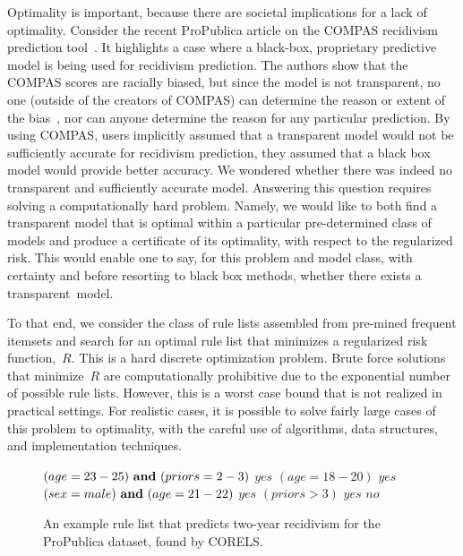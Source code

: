 Optimality is important, because there are societal implications for a lack of optimality.
%
Consider the recent ProPublica article on the COMPAS recidivism prediction tool~\citep{LarsonMaKiAn16}.
%
It highlights a case where a black-box, proprietary predictive model is being used for recidivism prediction.
%
The authors show that the COMPAS scores are racially biased, but since the model is not transparent, no one (outside of the creators of COMPAS) can determine the reason or extent of the bias~\citep{LarsonMaKiAn16}, nor can anyone determine the reason for any particular prediction.
%
By using COMPAS, users implicitly assumed that a transparent model
would not be sufficiently accurate for recidivism prediction,
\ie they assumed that a black box model would provide better accuracy.
%
We wondered whether there was indeed no transparent and sufficiently accurate model.
%
Answering this question requires solving a computationally hard problem.
%
Namely, we would like to both find a transparent model that is optimal
within a particular pre-determined class of models
and produce a certificate of its optimality, with respect to the regularized risk.
%
This would enable one to say, for this problem and model class,
with certainty and before resorting to black box methods,
whether there exists a transparent~model.

To that end, we consider the class of rule lists assembled from pre-mined frequent itemsets
and search for an optimal rule list that minimizes a regularized risk function,~$R$.
%
This is a hard discrete optimization problem.
%
Brute force solutions that minimize~$R$ are computationally prohibitive
due to the exponential number of possible rule lists.
%
However, this is a worst case bound that is not realized in practical settings.
%
For realistic cases, it is possible to solve fairly large cases of this problem to optimality,
with the careful use of algorithms, data structures, and implementation techniques.

\begin{kdd}
\begin{figure}[b!]
\vspace{-3mm}
\begin{algorithmic}
\normalsize
\State \bif $(age=23-25) {\bf ~and~} (priors=2-3)$ \bthen $yes$
\State \belif $(age=18-20)$ \bthen $yes$
\State \belif $(sex=male) {\bf ~and~} (age=21-22)$ \bthen $yes$
\State \belif $(priors>3)$ \bthen $yes$
\State \belse $no$
\end{algorithmic}
\vspace{-3mm}
\caption{An example rule list that predicts two-year recidivism
for the ProPublica dataset, found by CORELS.
}
\label{fig:rule-list}
\end{figure}
\end{kdd}

